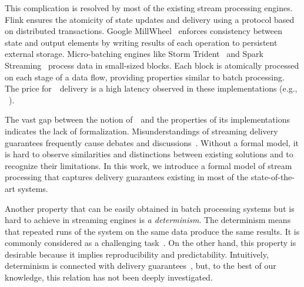 This complication is resolved by most of the existing stream processing engines. 
Flink ensures the atomicity of state updates and delivery using a protocol based on distributed transactions. 
Google MillWheel~\cite{Akidau:2013:MFS:2536222.2536229} enforces consistency between state and output elements by writing results of each operation to persistent external storage. 
Micro-batching engines like Storm Trident~\cite{apache:storm:trident} and Spark Streaming~\cite{Zaharia:2012:DSE:2342763.2342773} process data in small-sized blocks. 
Each block is atomically processed on each stage of a data flow, providing properties similar to batch processing. 
The price for~\eo\ delivery is a high latency observed in these implementations (e.g., ~\cite{7530084, 7474816}).


The vast gap between the notion of~\eo\ and the properties of its implementations indicates the lack of formalization. 
Misunderstandings of streaming delivery guarantees frequently cause debates and discussions~\cite{JerryPengStreamIO, PaperTrail}. Without a formal model, it is hard to observe similarities and distinctions between existing solutions and to recognize their limitations. In this work, we introduce a formal model of stream processing that captures delivery guarantees existing in most of the state-of-the-art systems.

Another property that can be easily obtained in batch processing systems but is hard to achieve in streaming engines is {\em a determinism}. 
The determinism means that repeated runs of the system on the same data produce the same results. It is commonly considered as a challenging task~\cite{Zacheilas:2017:MDS:3093742.3093921}. On the other hand, this property is desirable because it implies reproducibility and predictability. Intuitively, determinism is connected with delivery guarantees~\cite{Stonebraker:2005:RRS:1107499.1107504}, but, to the best of our knowledge, this relation has not been deeply investigated. 


